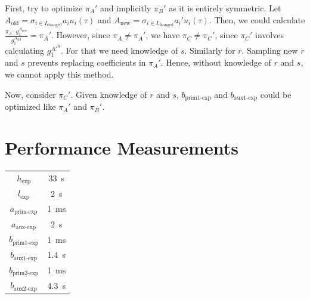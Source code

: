 \documentclass{article}
\begin{document}
First, try to optimize $\pi_A'$ and implicitly $\pi_B'$ as it is entirely symmetric.
Let $A_\text{old} = \sigma_{i\in I_\text{changed}} a_i u_i(\tau)$ and $A_\text{new} = \sigma_{i\in I_\text{changed}} a_i' u_i(\tau)$.
Then, we could calculate $\frac{\pi_A\cdot g_1^{A_\text{new}}}{g_1^{A_\text{old}}} = \pi_A'$.
However, since $\pi_A \neq \pi_A'$, we have $\pi_C \neq \pi_C'$, since $\pi_C'$ involves calculating ${g_1^{A'}}^s$. For that we need knowledge of $s$.
Similarly for $r$.
Sampling new $r$ and $s$ prevents replacing coefficients in $\pi_A'$.
Hence, without knowledge of $r$ and $s$, we cannot apply this method.

Now, consider $\pi_C'$.
Given knowledge of $r$ and $s$, $b_\text{prim1-exp}$ and $b_\text{aux1-exp}$ could be optimized like $\pi_A'$ and $\pi_B'$.


\section{Performance Measurements}

\begin{center}
\begin{tabular}{ c c }
        $h_\text{exp} $ & \SI{33}{\second} \\
        $l_\text{exp}$ & \SI{2}{\second} \\
        $a_\text{prim-exp}$ & \SI{1}{\milli\second} \\
        $a_\text{aux-exp}$ & \SI{2}{\second} \\
        $b_\text{prim1-exp}$ & \SI{1}{\milli\second} \\
        $b_\text{aux1-exp}$ & \SI{1.4}{\second} \\
        $b_\text{prim2-exp}$ & \SI{1}{\milli\second} \\
        $b_\text{aux2-exp}$ & \SI{4.3}{\second}
\end{tabular}
\end{center}

\end{document}
